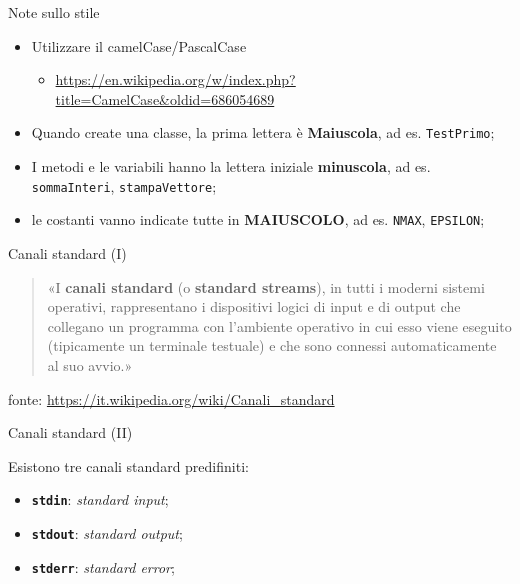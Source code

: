 
\begin{frame}{Note sullo stile}

  \begin{itemize}
    \item Utilizzare il camelCase/PascalCase
    \begin{itemize}
      \item \scriptsize{\url{https://en.wikipedia.org/w/index.php?title=CamelCase&oldid=686054689}}
    \end{itemize}
    \item Quando create una classe, la prima lettera è \textbf{Maiuscola}, ad es. \texttt{TestPrimo};
    \item I metodi e le variabili hanno la lettera iniziale \textbf{minuscola}, ad es. \texttt{sommaInteri}, \texttt{stampaVettore};
    \item le costanti vanno indicate tutte in \textbf{MAIUSCOLO}, ad es. \texttt{NMAX}, \texttt{EPSILON};
  \end{itemize}

\end{frame}

\begin{frame}{Canali standard (I)}

  \begin{quote}
     «I \textbf{canali standard} (o \textbf{standard streams}), in tutti i moderni sistemi operativi,
     rappresentano i dispositivi logici di input e di output che collegano un programma 
     con l'ambiente operativo in cui esso viene eseguito (tipicamente un terminale testuale)
     e che sono connessi automaticamente al suo avvio.»
  \end{quote}

  \vfill

  \begin{minipage}[c]{10cm}
    \scriptsize{fonte: \url{https://it.wikipedia.org/wiki/Canali_standard}}
  \end{minipage}

\end{frame}

\begin{frame}{Canali standard (II)}

  Esistono tre canali standard predifiniti:
  \begin{itemize}
   \item \texttt{\textbf{stdin}}: \emph{standard input};
   \item \texttt{\textbf{stdout}}: \emph{standard output};
   \item \texttt{\textbf{stderr}}: \emph{standard error};
  \end{itemize}

\end{frame}

